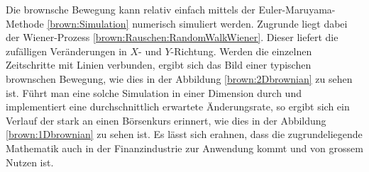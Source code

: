 Die brownsche Bewegung kann relativ einfach mittels der Euler-Maruyama-Methode \ref{brown:Simulation} numerisch simuliert werden. Zugrunde liegt dabei der Wiener-Prozess \ref{brown:Rauschen:RandomWalkWiener}. Dieser liefert die zufälligen Veränderungen in $ X $- und $ Y $-Richtung. Werden die einzelnen Zeitschritte mit Linien verbunden, ergibt sich das Bild einer typischen brownschen Bewegung, wie dies in der Abbildung \ref{brown:2Dbrownian} zu sehen ist. Führt man eine solche Simulation in einer Dimension durch und implementiert eine durchschnittlich erwartete Änderungsrate, so ergibt sich ein Verlauf der stark an einen Börsenkurs erinnert, wie dies in der Abbildung \ref{brown:1Dbrownian} zu sehen ist. Es lässt sich erahnen, dass die zugrundeliegende Mathematik auch in der Finanzindustrie zur Anwendung kommt und von grossem Nutzen ist.

